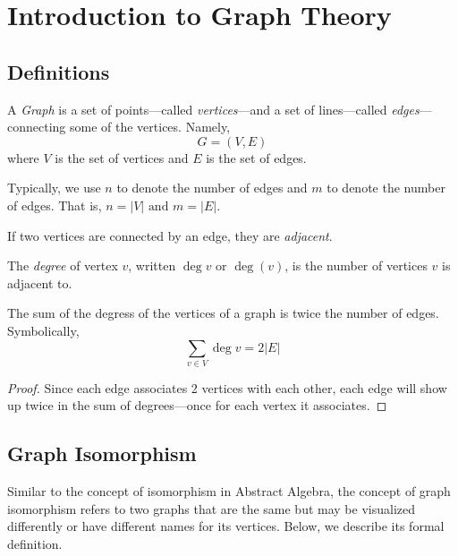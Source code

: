 \chapter{Introduction to Graph Theory}

\section{Definitions}

\begin{definition}[Graph]
  A \textit{Graph} is a set of points---called \textit{vertices}---and a set of lines---called \textit{edges}---connecting some of the vertices. Namely, 
  \begin{displaymath}
    G = (V, E)
  \end{displaymath}
  where \(V\) is the set of vertices and \(E\) is the set of edges.

  Typically, we use \(n\) to denote the number of edges and \(m\) to denote the number of edges. That is, \(n = |V| \text{ and } m = |E|\).
\end{definition}

\begin{definition}[Adjacency]
  If two vertices are connected by an edge, they are \textit{adjacent}. 
\end{definition}

\begin{definition}[Degree]
  The \textit{degree} of vertex \(v\), written \(\deg{v}\) or \(\deg(v)\), is
  the number of vertices \(v\) is adjacent to. 
\end{definition}

\begin{lemma}
  The sum of the degress of the vertices of a graph is twice the number of edges. Symbolically,
  \[ \sum_{v \in V} \deg{v} = 2|E| \]
\end{lemma}

\begin{proof}
  Since each edge associates 2 vertices with each other, each edge will show up twice in the sum of degrees---once for each vertex it associates.
\end{proof}

\section{Graph Isomorphism}

Similar to the concept of isomorphism in Abstract Algebra, the concept of graph
isomorphism refers to two graphs that are the same but may be visualized 
differently or have different names for its vertices. Below, we describe its 
formal definition.

